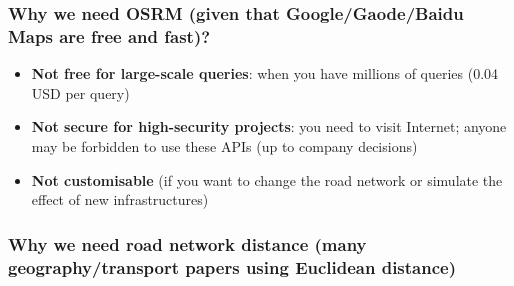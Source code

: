 \documentclass{beamer}
\begin{document}
\begin{frame}
\frametitle{Why we need OSRM (given that Google/Gaode/Baidu Maps are free and fast)?}
  \begin{itemize}
  \item \textbf{Not free for large-scale queries}: when you have millions of queries (0.04 USD per query)
  \item \textbf{Not secure for high-security projects}: you need to visit Internet; anyone may be forbidden to use these APIs (up to company decisions)
  \item \textbf{Not customisable} (if you want to change the road network or simulate the effect of new infrastructures)
  \end{itemize}
\end{frame}

\begin{frame}
\frametitle{Why we need road network distance (many geography/transport papers using Euclidean distance)}
  \begin{columns}[T]
  \end{columns}
\end{frame}
\end{document}
